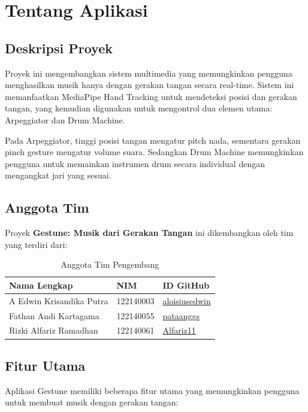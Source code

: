 \section{Tentang Aplikasi}

\subsection{Deskripsi Proyek}

Proyek ini mengembangkan sistem multimedia yang memungkinkan pengguna menghasilkan musik hanya dengan gerakan tangan secara real-time. Sistem ini memanfaatkan MediaPipe Hand Tracking untuk mendeteksi posisi dan gerakan tangan, yang kemudian digunakan untuk mengontrol dua elemen utama: Arpeggiator dan Drum Machine.

Pada Arpeggiator, tinggi posisi tangan mengatur pitch nada, sementara gerakan pinch gesture mengatur volume suara. Sedangkan Drum Machine memungkinkan pengguna untuk memainkan instrumen drum secara individual dengan mengangkat jari yang sesuai.

\subsection{Anggota Tim}

Proyek \textbf{Gestune: Musik dari Gerakan Tangan} ini dikembangkan oleh tim yang terdiri dari:

\begin{table}[H]
\centering
\caption{Anggota Tim Pengembang}
\label{tab:team}
\begin{tabular}{lll}
\hline
\textbf{Nama Lengkap} & \textbf{NIM} & \textbf{ID GitHub} \\ \hline
A Edwin Krisandika Putra & 122140003 & \href{https://github.com/aloisiusedwin}{aloisiusedwin} \\
Fathan Andi Kartagama & 122140055 & \href{https://github.com/pataanggs}{pataanggs} \\
Rizki Alfariz Ramadhan & 122140061 & \href{https://github.com/Alfariz11}{Alfariz11} \\
\hline
\end{tabular}
\end{table}

\subsection{Fitur Utama}

Aplikasi Gestune memiliki beberapa fitur utama yang memungkinkan pengguna untuk membuat musik dengan gerakan tangan:

